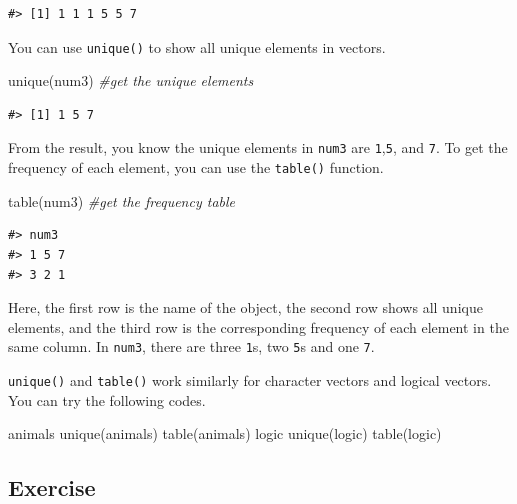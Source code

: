 \documentclass[
]{book}
\newenvironment{Shaded}{\begin{snugshade}}{\end{snugshade}}
\newcommand{\CommentTok}[1]{\textcolor[rgb]{0.56,0.35,0.01}{\textit{#1}}}
\newcommand{\FunctionTok}[1]{\textcolor[rgb]{0.00,0.00,0.00}{#1}}
\newcommand{\NormalTok}[1]{#1}
\begin{document}
\begin{verbatim}
#> [1] 1 1 1 5 5 7
\end{verbatim}

You can use \texttt{unique()} to show all unique elements in vectors.

\begin{Shaded}
\begin{Highlighting}[]
\FunctionTok{unique}\NormalTok{(num3)   }\CommentTok{\#get the unique elements}
\end{Highlighting}
\end{Shaded}

\begin{verbatim}
#> [1] 1 5 7
\end{verbatim}

From the result, you know the unique elements in \texttt{num3} are \texttt{1},\texttt{5}, and \texttt{7}. To get the frequency of each element, you can use the \texttt{table()} function.

\begin{Shaded}
\begin{Highlighting}[]
\FunctionTok{table}\NormalTok{(num3)    }\CommentTok{\#get the frequency table}
\end{Highlighting}
\end{Shaded}

\begin{verbatim}
#> num3
#> 1 5 7 
#> 3 2 1
\end{verbatim}

Here, the first row is the name of the object, the second row shows all unique elements, and the third row is the corresponding frequency of each element in the same column. In \texttt{num3}, there are three \texttt{1}s, two \texttt{5}s and one \texttt{7}.

\texttt{unique()} and \texttt{table()} work similarly for character vectors and logical vectors. You can try the following codes.

\begin{Shaded}
\begin{Highlighting}[]
\NormalTok{animals}
\FunctionTok{unique}\NormalTok{(animals)}
\FunctionTok{table}\NormalTok{(animals)}
\NormalTok{logic}
\FunctionTok{unique}\NormalTok{(logic)}
\FunctionTok{table}\NormalTok{(logic)}
\end{Highlighting}
\end{Shaded}

\hypertarget{exercise-3}{%
\subsection{Exercise}\label{exercise-3}}
\end{document}
